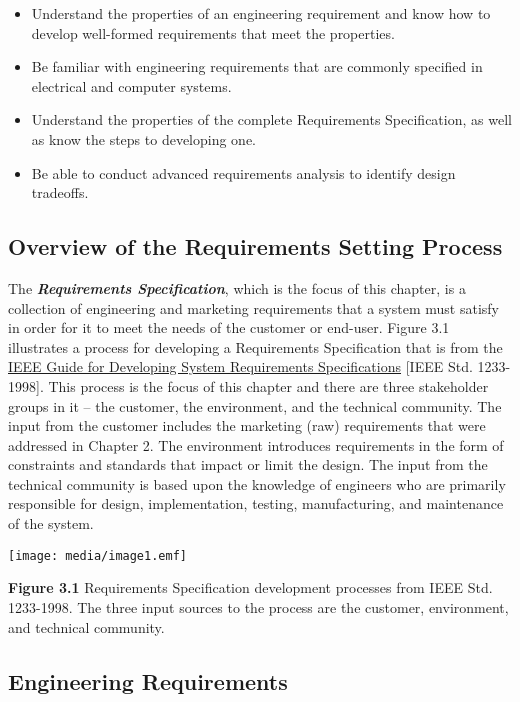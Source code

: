 \begin{itemize}
\item
  Understand the properties of an engineering requirement and know how
  to develop well-formed requirements that meet the properties.
\item
  Be familiar with engineering requirements that are commonly specified
  in electrical and computer systems.
\item
  Understand the properties of the complete Requirements Specification,
  as well as know the steps to developing one.
\item
  Be able to conduct advanced requirements analysis to identify design
  tradeoffs.
\end{itemize}

\subsection{Overview of the Requirements Setting
Process}\label{overview-of-the-requirements-setting-process}

The \emph{\textbf{Requirements Specification}}, which is the focus of
this chapter, is a collection of engineering and marketing requirements
that a system must satisfy in order for it to meet the needs of the
customer or end-user. Figure 3.1 illustrates a process for developing a
Requirements Specification that is from the \ul{IEEE Guide for
Developing System Requirements Specifications} {[}IEEE Std.
1233-1998{]}. This process is the focus of this chapter and there are
three stakeholder groups in it -- the customer, the environment, and the
technical community. The input from the customer includes the marketing
(raw) requirements that were addressed in Chapter 2. The environment
introduces requirements in the form of constraints and standards that
impact or limit the design. The input from the technical community is
based upon the knowledge of engineers who are primarily responsible for
design, implementation, testing, manufacturing, and maintenance of the
system.

\texttt{[image: media/image1.emf]}

\textbf{Figure 3.1} Requirements Specification development processes
from IEEE Std. 1233-1998. The three input sources to the process are the
customer, environment, and technical community.

\subsection{Engineering Requirements}\label{engineering-requirements}

